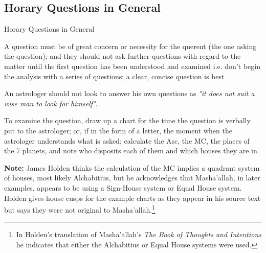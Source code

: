 \subsection{Horary Questions in General}
\begin{frame}[t]{Horary Questions in General}

A question must be of great concern or necessity for the querent (the one asking the question); and they should not ask further questions with regard to the matter until the first question has been understood and examined i.e. don't begin the analysis with a series of questions; a clear, concise question is best

An astrologer should not look to answer his own questions as \textsl{"it does not suit a wise man to look for himself"}. 

To examine the question, draw up a chart for the time the question is verbally put to the astrologer; or, if in the form of a letter, the moment when the astrologer understands what is asked; calculate the Asc, the MC, the places of the 7 planets, and note who disposits each of them and which houses they are in.
\vspace{0.25cm}
\begin{mdframed}[backgroundcolor=gray!5, rightmargin=2em, leftmargin=2em]
\small
\textbf{Note:} James Holden thinks the calculation of the MC implies a quadrant system of houses, most likely Alchabitius, but he acknowledges that Masha'allah, in later examples, appears to be using a Sign-House system or Equal House system. Holden gives house cusps for the example charts as they appear in his source text but says they were not original to Masha'allah.\footnote{In Holden's translation of Masha'allah's \textsl{The Book of Thoughts and Intentions} he indicates that either the Alchabitius or Equal House systems were used.}
\end{mdframed}

\end{frame}